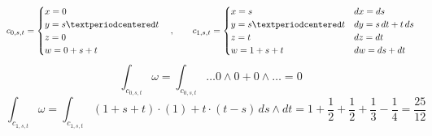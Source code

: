 \documentclass[12pt]{article}					%
\begin{document}
\begin{priklad}[1.]
\begin{reseni}
            $$ c_{0, s, t} = \begin{cases} x = 0 \\ y = s·t \\ z = 0 \\ w = 0 + s + t \end{cases}, \hskip 2em
            c_{1, s, t} = \begin{cases} x = s & dx = ds \\ y = s·t & dy = s\,dt + t\,ds \\ z = t & dz = dt \\ w = 1 + s + t & dw = ds + dt \end{cases} $$
            $$ \int_{c_{0, s, t}}\omega = \int_{c_{0, s, t}}… 0\wedge 0 + 0 \wedge… = 0 $$ 
            $$ \int_{c_{1, s, t}}\omega = \int_{c_{1, s, t}}(1+s+t)·(1) + t·(t-s)\, ds\wedge dt = 1 + \frac{1}{2} + \frac{1}{2} + \frac{1}{3} - \frac{1}{4} = \frac{25}{12} $$
        \end{reseni}
    \end{priklad}

    \pagebreak
\end{document}
